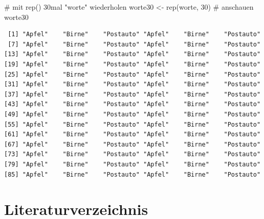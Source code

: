 \documentclass[
  11pt,
  a4paperpaper,
]{scrreprt}
\newenvironment{Shaded}{\begin{snugshade}}{\end{snugshade}}
\newcommand{\CommentTok}[1]{\textcolor[rgb]{0.37,0.37,0.37}{#1}}
\newcommand{\DecValTok}[1]{\textcolor[rgb]{0.68,0.00,0.00}{#1}}
\newcommand{\FunctionTok}[1]{\textcolor[rgb]{0.28,0.35,0.67}{#1}}
\newcommand{\NormalTok}[1]{\textcolor[rgb]{0.00,0.23,0.31}{#1}}
\newcommand{\OtherTok}[1]{\textcolor[rgb]{0.00,0.23,0.31}{#1}}
\begin{document}
\begin{tcolorbox}[enhanced jigsaw, breakable, left=2mm, colbacktitle=quarto-callout-tip-color!10!white, coltitle=black, colframe=quarto-callout-tip-color-frame, arc=.35mm, toptitle=1mm, opacitybacktitle=0.6, rightrule=.15mm, opacityback=0, toprule=.15mm, bottomrule=.15mm, colback=white, title=\textcolor{quarto-callout-tip-color}{\faLightbulb}\hspace{0.5em}{c) Erzeugen Sie einen weiteren Datenvektor, in welchem die Wörter
``Apfel'', ``Birne'' und ``Postauto'' 30 mal wiederholt werden.}, leftrule=.75mm, titlerule=0mm, bottomtitle=1mm]

\begin{Shaded}
\begin{Highlighting}[]
\CommentTok{\# mit rep() 30mal "worte" wiederholen}
\NormalTok{worte30 }\OtherTok{\textless{}{-}} \FunctionTok{rep}\NormalTok{(worte, }\DecValTok{30}\NormalTok{)}
\CommentTok{\# anschauen}
\NormalTok{worte30}
\end{Highlighting}
\end{Shaded}

\begin{verbatim}
 [1] "Apfel"    "Birne"    "Postauto" "Apfel"    "Birne"    "Postauto"
 [7] "Apfel"    "Birne"    "Postauto" "Apfel"    "Birne"    "Postauto"
[13] "Apfel"    "Birne"    "Postauto" "Apfel"    "Birne"    "Postauto"
[19] "Apfel"    "Birne"    "Postauto" "Apfel"    "Birne"    "Postauto"
[25] "Apfel"    "Birne"    "Postauto" "Apfel"    "Birne"    "Postauto"
[31] "Apfel"    "Birne"    "Postauto" "Apfel"    "Birne"    "Postauto"
[37] "Apfel"    "Birne"    "Postauto" "Apfel"    "Birne"    "Postauto"
[43] "Apfel"    "Birne"    "Postauto" "Apfel"    "Birne"    "Postauto"
[49] "Apfel"    "Birne"    "Postauto" "Apfel"    "Birne"    "Postauto"
[55] "Apfel"    "Birne"    "Postauto" "Apfel"    "Birne"    "Postauto"
[61] "Apfel"    "Birne"    "Postauto" "Apfel"    "Birne"    "Postauto"
[67] "Apfel"    "Birne"    "Postauto" "Apfel"    "Birne"    "Postauto"
[73] "Apfel"    "Birne"    "Postauto" "Apfel"    "Birne"    "Postauto"
[79] "Apfel"    "Birne"    "Postauto" "Apfel"    "Birne"    "Postauto"
[85] "Apfel"    "Birne"    "Postauto" "Apfel"    "Birne"    "Postauto"
\end{verbatim}

\end{tcolorbox}


\chapter*{Literaturverzeichnis}\label{literaturverzeichnis}
\end{document}
